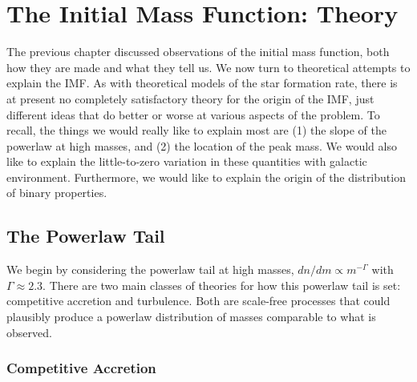 \chapter{The Initial Mass Function: Theory}
\label{ch:imf_th}


The previous chapter discussed observations of the initial mass function, both how they are made and what they tell us. We now turn to theoretical attempts to explain the IMF. As with theoretical models of the star formation rate, there is at present no completely satisfactory theory for the origin of the IMF, just different ideas that do better or worse at various aspects of the problem. To recall, the things we would really like to explain most are (1) the slope of the powerlaw at high masses, and (2) the location of the peak mass. We would also like to explain the little-to-zero variation in these quantities with galactic environment. Furthermore, we would like to explain the origin of the distribution of binary properties.

\section{The Powerlaw Tail}

We begin by considering the powerlaw tail at high masses, $dn/dm \propto m^{-\Gamma}$ with $\Gamma \approx 2.3$. There are two main classes of theories for how this powerlaw tail is set: competitive accretion and turbulence. Both are scale-free processes that could plausibly produce a powerlaw distribution of masses comparable to what is observed.

\subsection{Competitive Accretion}

